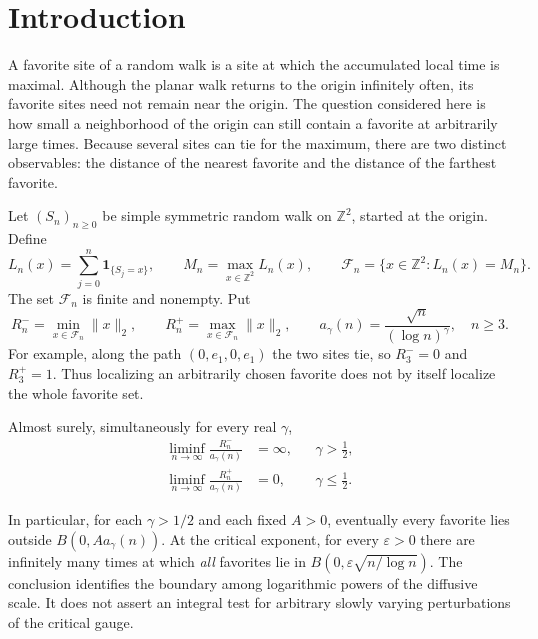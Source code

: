 \section{Introduction}\label{sec:introduction}

A favorite site of a random walk is a site at which the accumulated local time
is maximal. Although the planar walk returns to the origin infinitely often,
its favorite sites need not remain near the origin. The question considered
here is how small a neighborhood of the origin can still contain a favorite
at arbitrarily large times. Because several sites can tie for the maximum,
there are two distinct observables: the distance of the nearest favorite and
the distance of the farthest favorite.

Let $(S_n)_{n\ge0}$ be simple symmetric random walk on $\mathbb Z^2$, started
at the origin. Define
\begin{equation}\label{eq:local-time-definition}
 L_n(x)=\sum_{j=0}^n\mathbf1_{\{S_j=x\}},\qquad
 M_n=\max_{x\in\mathbb Z^2}L_n(x),\qquad
 \mathcal F_n=\{x\in\mathbb Z^2:L_n(x)=M_n\}.
\end{equation}
The set $\mathcal F_n$ is finite and nonempty. Put
\begin{equation}\label{eq:radii-definition}
 R_n^- =\min_{x\in\mathcal F_n}\|x\|_2,\qquad
 R_n^+ =\max_{x\in\mathcal F_n}\|x\|_2,
 \qquad
 a_\gamma(n)=\frac{\sqrt n}{(\log n)^\gamma},\quad n\ge3.
\end{equation}
For example, along the path $(0,e_1,0,e_1)$ the two sites tie, so
$R_3^-=0$ and $R_3^+=1$. Thus localizing an arbitrarily chosen favorite
does not by itself localize the whole favorite set.

\begin{theorem}\label{main:precise-escape-rate}
Almost surely, simultaneously for every real $\gamma$,
\begin{align}
 \liminf_{n\to\infty}\frac{R_n^-}{a_\gamma(n)}
 &=\infty, &&\gamma>\tfrac12,\label{eq:main-escape}\\
 \liminf_{n\to\infty}\frac{R_n^+}{a_\gamma(n)}
 &=0, &&\gamma\le\tfrac12.\label{eq:main-recurrence}
\end{align}
\end{theorem}

In particular, for each $\gamma>1/2$ and each fixed $A>0$, eventually
every favorite lies outside $B(0,Aa_\gamma(n))$. At the critical exponent,
for every $\varepsilon>0$ there are infinitely many times at which
\emph{all} favorites lie in $B(0,\varepsilon\sqrt{n/\log n})$.
The conclusion identifies the boundary among logarithmic powers of the
diffusive scale. It does not assert an integral test for arbitrary slowly
varying perturbations of the critical gauge.

